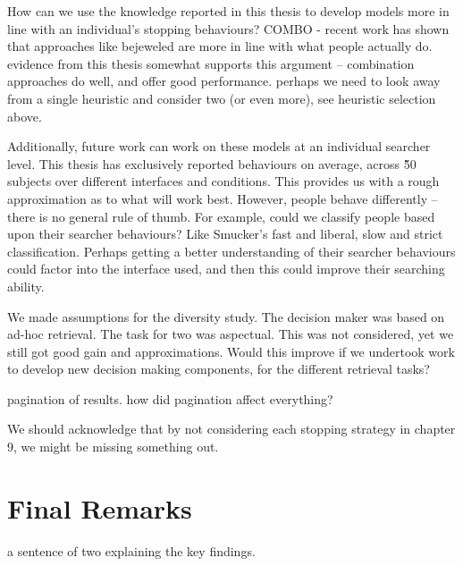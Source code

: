 How can we use the knowledge reported in this thesis to develop models more in line with an individual's stopping behaviours?
COMBO - recent work has shown that approaches like bejeweled are more in line with what people actually do. evidence from this thesis somewhat supports this argument -- combination approaches do well, and offer good performance. perhaps we need to look away from a single heuristic and consider two (or even more), see heuristic selection above.

Additionally, future work can work on these models at an individual searcher level. This thesis has exclusively reported behaviours on average, across \~ 50 subjects over different interfaces and conditions. This provides us with a rough approximation as to what will work best. However, people behave differently -- there is no general rule of thumb. For example, could we classify people based upon their searcher behaviours? Like Smucker's fast and liberal, slow and strict classification. Perhaps getting a better understanding of their searcher behaviours could factor into the interface used, and then this could improve their searching ability.

We made assumptions for the diversity study. The decision maker was based on ad-hoc retrieval.
The task for two was aspectual. This was not considered, yet we still got good gain and approximations. Would this improve if we undertook work to develop new decision making components, for the different retrieval tasks?

pagination of results. how did pagination affect everything?

We should acknowledge that by not considering each stopping strategy in chapter 9, we might be missing something out.


\section{Final Remarks}
a sentence of two explaining the key findings.



